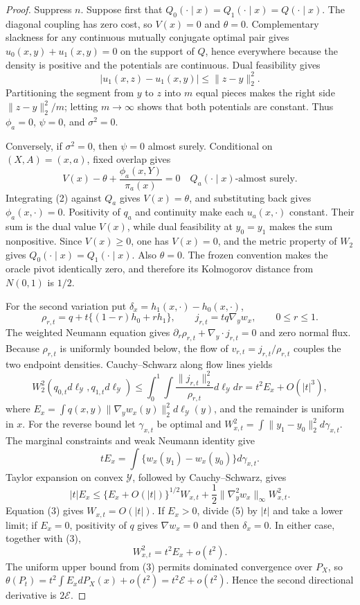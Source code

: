 \documentclass{article}
\begin{document}
\begin{proof}
Suppress \(n\). Suppose first that \(Q_0(\cdot\mid x)=Q_1(\cdot\mid x)=Q(\cdot\mid x)\). The diagonal coupling has zero cost, so \(V(x)=0\) and \(\theta=0\). Complementary slackness for any continuous mutually conjugate optimal pair gives \(u_0(x,y)+u_1(x,y)=0\) on the support of \(Q\), hence everywhere because the density is positive and the potentials are continuous. Dual feasibility gives
\[|u_1(x,z)-u_1(x,y)|\le\lVert z-y\rVert_2^2.\tag{1}\]
Partitioning the segment from \(y\) to \(z\) into \(m\) equal pieces makes the right side \(\lVert z-y\rVert_2^2/m\); letting \(m\to\infty\) shows that both potentials are constant. Thus \(\phi_a=0\), \(\psi=0\), and \(\sigma^2=0\).

Conversely, if \(\sigma^2=0\), then \(\psi=0\) almost surely. Conditional on \((X,A)=(x,a)\), fixed overlap gives
\[V(x)-\theta+\frac{\phi_a(x,Y)}{\pi_a(x)}=0\quad Q_a(\cdot\mid x)\text{-almost surely}.\tag{2}\]
Integrating (2) against \(Q_a\) gives \(V(x)=\theta\), and substituting back gives \(\phi_a(x,\cdot)=0\). Positivity of \(q_a\) and continuity make each \(u_a(x,\cdot)\) constant. Their sum is the dual value \(V(x)\), while dual feasibility at \(y_0=y_1\) makes the sum nonpositive. Since \(V(x)\ge0\), one has \(V(x)=0\), and the metric property of \(W_2\) gives \(Q_0(\cdot\mid x)=Q_1(\cdot\mid x)\). Also \(\theta=0\). The frozen convention makes the oracle pivot identically zero, and therefore its Kolmogorov distance from \(N(0,1)\) is \(1/2\).

For the second variation put \(\delta_x=h_1(x,\cdot)-h_0(x,\cdot)\),
\[\rho_{r,t}=q+t\{(1-r)h_0+rh_1\},\qquad j_{r,t}=tq\nabla_yw_x,\qquad 0\le r\le1.\]
The weighted Neumann equation gives \(\partial_r\rho_{r,t}+\nabla_y\cdot j_{r,t}=0\) and zero normal flux. Because \(\rho_{r,t}\) is uniformly bounded below, the flow of \(v_{r,t}=j_{r,t}/\rho_{r,t}\) couples the two endpoint densities. Cauchy--Schwarz along flow lines yields
\[W_2^2(q_{0,t}d\ell_{\mathcal Y},q_{1,t}d\ell_{\mathcal Y})\le\int_0^1\!\int\frac{\lVert j_{r,t}\rVert_2^2}{\rho_{r,t}}d\ell_{\mathcal Y}dr=t^2E_x+O(|t|^3),\tag{3}\]
where \(E_x=\int q(x,y)\lVert\nabla_yw_x(y)\rVert_2^2d\ell_{\mathcal Y}(y)\), and the remainder is uniform in \(x\). For the reverse bound let \(\gamma_{x,t}\) be optimal and \(W_{x,t}^2=\int\lVert y_1-y_0\rVert_2^2d\gamma_{x,t}\). The marginal constraints and weak Neumann identity give
\[tE_x=\int\{w_x(y_1)-w_x(y_0)\}d\gamma_{x,t}.\tag{4}\]
Taylor expansion on convex \(\mathcal Y\), followed by Cauchy--Schwarz, gives
\[|t|E_x\le\{E_x+O(|t|)\}^{1/2}W_{x,t}+\frac12\lVert\nabla_y^2w_x\rVert_\infty W_{x,t}^2.\tag{5}\]
Equation (3) gives \(W_{x,t}=O(|t|)\). If \(E_x>0\), divide (5) by \(|t|\) and take a lower limit; if \(E_x=0\), positivity of \(q\) gives \(\nabla w_x=0\) and then \(\delta_x=0\). In either case, together with (3),
\[W_{x,t}^2=t^2E_x+o(t^2).\tag{6}\]
The uniform upper bound from (3) permits dominated convergence over \(P_X\), so \(\theta(P_t)=t^2\int E_xdP_X(x)+o(t^2)=t^2\mathcal E+o(t^2)\). Hence the second directional derivative is \(2\mathcal E\).
\end{proof}
\end{document}
